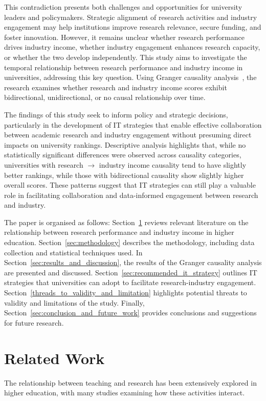 \documentclass[a4paper, conference]{IEEEtran}
\begin{document}
This contradiction presents both challenges and opportunities for university leaders and policymakers. Strategic alignment of research activities and industry engagement may help institutions improve research relevance, secure funding, and foster innovation. However, it remains unclear whether research performance drives industry income, whether industry engagement enhances research capacity, or whether the two develop independently. This study aims to investigate the temporal relationship between research performance and industry income in universities, addressing this key question. Using Granger causality analysis~\cite{granger1969investigating}, the research examines whether research and industry income scores exhibit bidirectional, unidirectional, or no causal relationship over time.

The findings of this study seek to inform policy and strategic decisions, particularly in the development of IT strategies that enable effective collaboration between academic research and industry engagement without presuming direct impacts on university rankings. Descriptive analysis highlights that, while no statistically significant differences were observed across causality categories, universities with research $\rightarrow$ industry income causality tend to have slightly better rankings, while those with bidirectional causality show slightly higher overall scores. These patterns suggest that IT strategies can still play a valuable role in facilitating collaboration and data-informed engagement between research and industry.

The paper is organised as follows: Section~\ref{sec:related_work} reviews relevant literature on the relationship between research performance and industry income in higher education. Section~\ref{sec:methodology} describes the methodology, including data collection and statistical techniques used. In Section~\ref{sec:results_and_discussion}, the results of the Granger causality analysis are presented and discussed. Section~\ref{sec:recommended_it_strategy} outlines IT strategies that universities can adopt to facilitate research-industry engagement. Section~\ref{threads_to_validity_and_limitation} highlights potential threats to validity and limitations of the study. Finally, Section~\ref{sec:conclusion_and_future_work} provides conclusions and suggestions for future research.



\section{Related Work} \label{sec:related_work}  
The relationship between teaching and research has been extensively explored in higher education, with many studies examining how these activities interact. 
\end{document}
